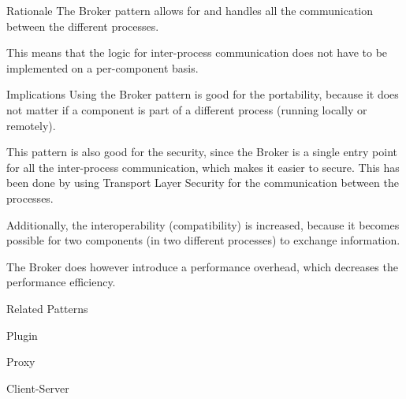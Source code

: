 \begin{patdescription}
\item [Rationale]  
The Broker pattern allows for and handles all the communication between the different processes. 

This means that the logic for inter-process communication does not have to be implemented on a per-component basis.

\item [Implications]
Using the Broker pattern is good for the portability, because it does not matter if a component is part of a different process (running locally or remotely).

This pattern is also good for the security, since the Broker is a single entry point for all the inter-process communication, which makes it easier to secure. This has been done by using Transport Layer Security for the communication between the processes.

Additionally, the interoperability (compatibility) is increased, because it becomes possible for two components (in two different processes) to exchange information. 

The Broker does however introduce a performance overhead, which decreases the performance efficiency.



\item [Related Patterns]
\begin{mynesteditemlist}
\item Plugin
\item Proxy
\item Client-Server
\end{mynesteditemlist}

\end{patdescription}

